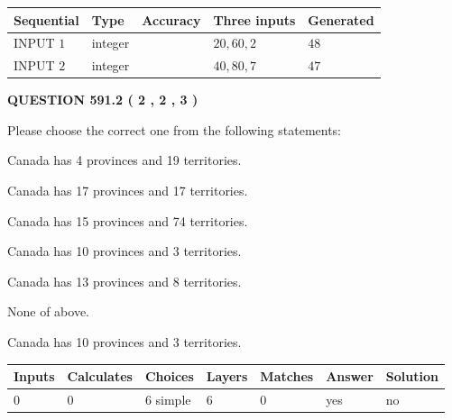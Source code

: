 \documentclass[12pt]{article}
\begin{document}
   
  
  
\noindent\begin{tabular}{|l|l|l|l|l|}
\hline
 Sequential & Type & Accuracy & Three inputs & Generated \\ 
\hline
 
 
  INPUT $  1 $ & integer &  & $
 20
 , 
 60
 , 
 2
 $ & $ 48 $ 
 \\  \hline  
 
 
  INPUT $  2 $ & integer &  & $
 40
 , 
 80
 , 
 7
 $ & $ 47 $ 
 \\  \hline  
 \end{tabular}
   
   
  
\vspace{0.2in}
  
{\textbf{\Large{QUESTION
591.2 
 ( 2 , 2 , 3 )
}}}
  
  
Please choose the correct one from the following statements:
 
 
Canada has   4 provinces and  19 territories.
 
 
Canada has  17 provinces and  17 territories.
 
 
Canada has  15 provinces and  74 territories.
 
 
Canada has 10  provinces and 3 territories.
 
 
Canada has  13 provinces and  8 territories.
 
 
 None of above.
 
 
\noindent{}
 
 
Canada has 10  provinces and 3 territories.
 
 
\noindent{}
 
 
   
   
   
   
\noindent\begin{tabular}{|l|l|l|l|l|l|l|}
 \hline
Inputs & Calculates & Choices & Layers & Matches & Answer & Solution \\ \hline
 0  & 
 0  & 
 6
  simple  
  & 
 6  & 
 0  & 
  yes & 
  no 
  \\ \hline
 \end{tabular}
   
\end{document}
